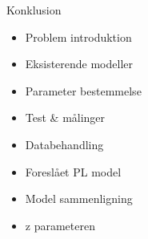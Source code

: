 \begin{frame}{Konklusion}
	\begin{minipage}{0.5\textwidth}
		\begin{itemize}
		\item Problem introduktion
		\item Eksisterende modeller
		\item Parameter bestemmelse
		\item Test \& målinger
		\item Databehandling
		\item Foreslået PL model
		\item Model sammenligning
		\item z parameteren
		\end{itemize}
	\end{minipage}%
	\begin{minipage}{0.5\textwidth}
		\resizebox{\textwidth}{!}{
		
		}
	\end{minipage}%
\end{frame}